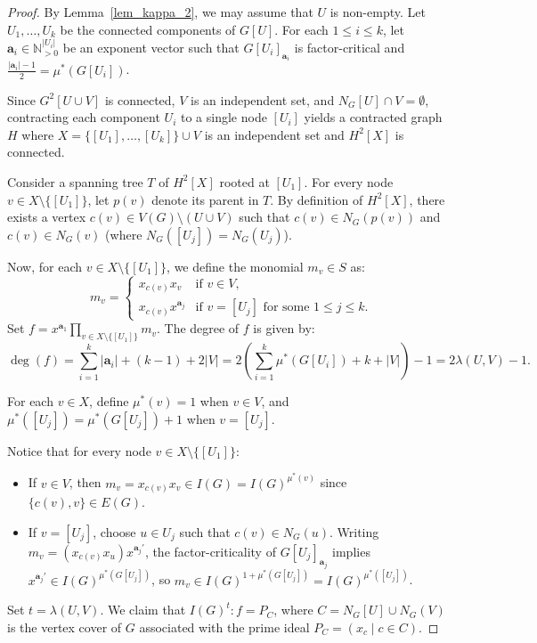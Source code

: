 \documentclass[12pt,reqno,twoside]{amsart}
\theoremstyle{definition}
\theoremstyle{plain}
\theoremstyle{remark}
\numberwithin{equation}{section}
\begin{document}
\begin{proof} 
By Lemma~\ref{lem_kappa_2}, we may assume that $U$ is non-empty. Let $U_1, \ldots, U_k$ be the connected components of $G[U]$. For each $1 \le i \le k$, let $\mathbf{a}_i \in \mathbb{N}_{>0}^{|U_i|}$ be an exponent vector such that $G[U_i]_{\mathbf{a}_i}$ is factor-critical and $\frac{|\mathbf{a}_i| - 1}{2} = \mu^*(G[U_i])$. 

Since $G^2[U \cup V]$ is connected, $V$ is an independent set, and $N_G[U] \cap V = \emptyset$, contracting each component $U_i$ to a single node $[U_i]$ yields a contracted graph $H$ where $X = \{[U_1], \ldots, [U_k]\} \cup V$ is an independent set and $H^2[X]$ is connected.

Consider a spanning tree $T$ of $H^2[X]$ rooted at $[U_1]$. For every node $v \in X \setminus \{[U_1]\}$, let $p(v)$ denote its parent in $T$. By definition of $H^2[X]$, there exists a vertex $c(v) \in V(G) \setminus (U \cup V)$ such that $c(v) \in N_G(p(v))$ and $c(v) \in N_G(v)$ (where $N_G([U_j]) = N_G(U_j)$).

Now, for each $v \in X \setminus \{[U_1]\}$, we define the monomial $m_v \in S$ as:
\[
m_v = 
\begin{cases}
x_{c(v)} x_v & \text{if } v \in V, \\
x_{c(v)} x^{\mathbf{a}_j} & \text{if } v = [U_j] \text{ for some } 1 \le j \le k.
\end{cases}
\]
Set $f = x^{\mathbf{a}_1} \prod_{v \in X \setminus \{[U_1]\}} m_v$. The degree of $f$ is given by:
\[
\deg(f) = \sum_{i=1}^k |\mathbf{a}_i| + (k - 1) + 2|V| = 2 \left( \sum_{i=1}^k \mu^*(G[U_i]) + k + |V| \right) - 1 = 2\lambda(U,V) - 1.
\]

For each $v \in X$, define $\mu^*(v) = 1$ when $v \in V$, and $\mu^*([U_j]) = \mu^*(G[U_j]) + 1$ when $v = [U_j]$. 

Notice that for every node $v \in X \setminus \{[U_1]\}$:
\begin{itemize}
    \item If $v \in V$, then $m_v = x_{c(v)} x_v \in I(G) = I(G)^{\mu^*(v)}$ since $\{c(v), v\} \in E(G)$.
    \item If $v = [U_j]$, choose $u \in U_j$ such that $c(v) \in N_G(u)$. Writing $m_v = (x_{c(v)} x_u) x^{\mathbf{a}_j'}$, the factor-criticality of $G[U_j]_{\mathbf{a}_j}$ implies $x^{\mathbf{a}_j'} \in I(G)^{\mu^*(G[U_j])}$, so $m_v \in I(G)^{1 + \mu^*(G[U_j])} = I(G)^{\mu^*([U_j])}$.
\end{itemize}

Set $t = \lambda(U,V)$. We claim that $I(G)^t : f = P_C$, where $C = N_G[U] \cup N_G(V)$ is the vertex cover of $G$ associated with the prime ideal $P_C = (x_c \mid c \in C)$. 


\end{proof}
\end{document}

